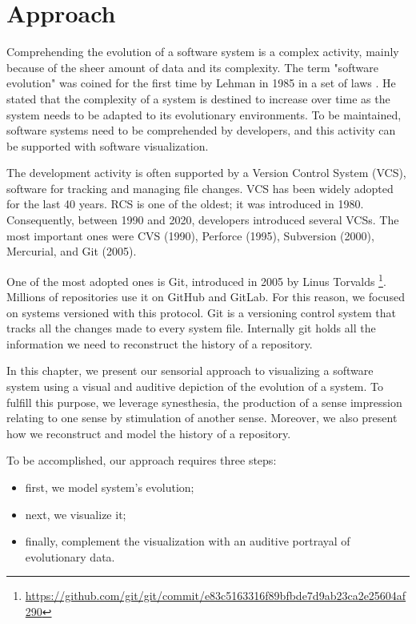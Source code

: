 
\chapter[Approach]{Approach}
\graphicspath{ {images/approach} }

Comprehending the evolution of a software system is a complex activity, mainly because of the sheer amount of data and its complexity. 
The term "software evolution" was coined for the first time by Lehman in 1985 in a set of laws \cite{Lehman1985}.
He stated that the complexity of a system is destined to increase over time as the system needs to be adapted to its evolutionary environments. 
To be maintained, software systems need to be comprehended by developers, and this activity can be supported with software visualization. 

The development activity is often supported by a Version Control System (VCS), software for tracking and managing file changes. VCS has been widely adopted for the last 40 years. RCS is one of the oldest; it was introduced in 1980. Consequently, between 1990 and 2020, developers introduced several VCSs. The most important ones were CVS (1990), Perforce (1995), Subversion (2000), Mercurial, and Git (2005).

One of the most adopted ones is Git, introduced in 2005 by Linus Torvalds \footnote{\url{https://github.com/git/git/commit/e83c5163316f89bfbde7d9ab23ca2e25604af290}}. Millions of repositories use it on GitHub and GitLab. 
For this reason, we focused on systems versioned with this protocol.
Git is a versioning control system that tracks all the changes made to every system file. 
Internally git holds all the information we need to reconstruct the history of a repository. 

In this chapter, we present our sensorial approach to visualizing a software system using a visual and auditive depiction of the evolution of a system. 
To fulfill this purpose, we leverage synesthesia, the production of a sense impression relating to one sense by stimulation of another sense.
Moreover, we also present how we reconstruct and model the history of a repository. 

To be accomplished, our approach requires three steps: 
\begin{itemize}
    \item first, we model system's evolution; 
    \item next, we visualize it;
    \item finally, complement the visualization with an auditive portrayal of evolutionary data. 
\end{itemize}

